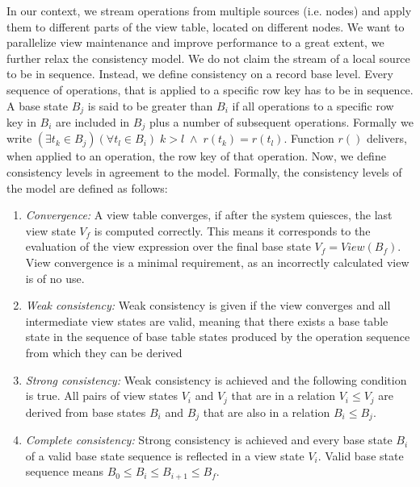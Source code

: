 In our context, we stream operations from multiple 
sources (i.e. nodes) and apply them to different parts of the view 
table, located on different nodes. We want to parallelize view 
maintenance and improve performance to a great extent, we further relax 
the consistency model. We do not claim the stream of a local source to 
be in sequence. Instead, we define consistency on a record base level. 
Every sequence of operations, that is applied to a specific row key has 
to be in sequence. A base state $B_j$ is said to be greater than $B_i$ 
if all operations to a specific row key in $B_i$ are included in $B_j$ 
plus a number of subsequent operations. Formally we write $(\exists t_k 
\in B_j)(\forall t_l \in B_i)\;k > l\;\land\; r(t_k)=r(t_l)$. Function 
$r()$ delivers, when applied to an operation, the row key of that 
operation. Now, we define consistency levels in agreement to the 
model. Formally, the consistency levels of the model are 
defined as follows:


\begin{enumerate}
 \setlength{\itemsep}{5pt}
\item[]\textit{Convergence:} A view table converges, if after the system
  quiesces, the last view state $V_f$ is computed correctly. This
  means it corresponds to the evaluation of the view expression over
  the final base state $V_f=View(B_f)$. View convergence is a minimal 
  requirement, as an incorrectly calculated view is of no use.

\item[]\textit{Weak consistency:} Weak consistency is given if the view
  converges and all intermediate view states are valid, meaning that
  there exists a base table state in the sequence of base table states
  produced by the operation sequence from which they can be derived

\item[]\textit{Strong consistency:} Weak consistency is achieved and the
  following condition is true. All pairs of view states $V_i$ and
  $V_j$ that are in a relation $V_i \leq V_j$ are derived from base
  states $B_i$ and $B_j$ that are also in a relation $B_i \leq B_j$.

\item[]\textit{Complete consistency:} Strong consistency is achieved
  and every base state $B_i$ of a valid base state sequence is
  reflected in a view state $V_i$. Valid base state sequence means
  $B_0 \leq B_i \leq B_{i+1}\leq B_f$.
\end{enumerate}


